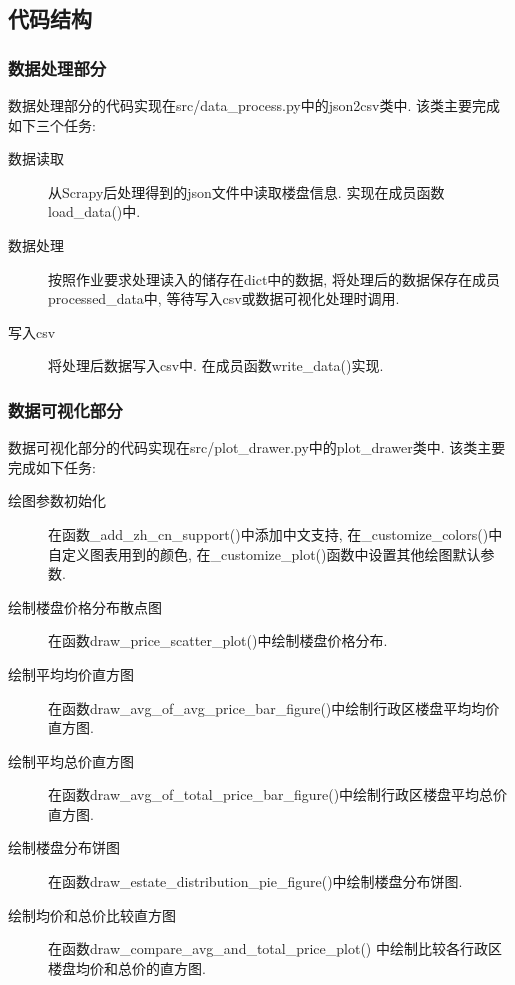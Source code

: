 \subsection{代码结构}
\subsubsection{数据处理部分}
数据处理部分的代码实现在src/data\_process.py中的json2csv类中.
该类主要完成如下三个任务:
\begin{description}
    \item[数据读取] 从Scrapy后处理得到的json文件中读取楼盘信息.
        实现在成员函数load\_data()中.
    \item[数据处理] 按照作业要求处理读入的储存在dict中的数据,
        将处理后的数据保存在成员processed\_data中,
        等待写入csv或数据可视化处理时调用.
    \item[写入csv] 将处理后数据写入csv中. 在成员函数write\_data()实现.
\end{description}

\subsubsection{数据可视化部分}
数据可视化部分的代码实现在src/plot\_drawer.py中的plot\_drawer类中.
该类主要完成如下任务:

\begin{description}
    \item[绘图参数初始化] 在函数\_add\_zh\_cn\_support()中添加中文支持,
        在\_customize\_colors()中自定义图表用到的颜色,
        在\_customize\_plot()函数中设置其他绘图默认参数.
    \item[绘制楼盘价格分布散点图]
        在函数draw\_price\_scatter\_plot()中绘制楼盘价格分布.
    \item[绘制平均均价直方图]
        在函数draw\_avg\_of\_avg\_price\_bar\_figure()中绘制行政区楼盘平均均价直方图.
    \item[绘制平均总价直方图]
        在函数draw\_avg\_of\_total\_price\_bar\_figure()中绘制行政区楼盘平均总价直方图.
    \item[绘制楼盘分布饼图]
        在函数draw\_estate\_distribution\_pie\_figure()中绘制楼盘分布饼图.
    \item[绘制均价和总价比较直方图]
        在函数draw\_compare\_avg\_and\_total\_price\_plot()
        中绘制比较各行政区楼盘均价和总价的直方图.
\end{description}

